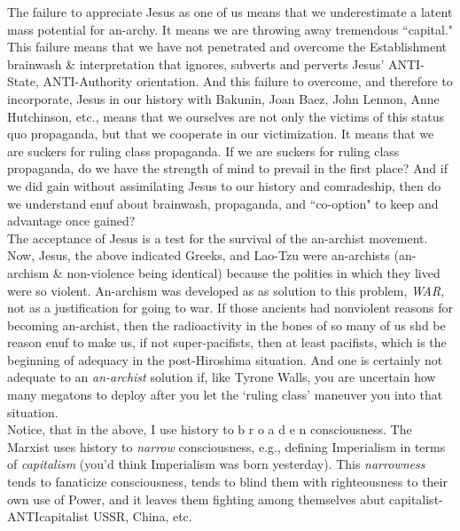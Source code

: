 \documentclass[12pt, onecolumn, letterpaper, oneside]{book}
\begin{document}
The failure to appreciate Jesus as one of us means that we underestimate a latent mass potential for an-archy. It means we are throwing away tremendous ``capital." This failure means that we have not penetrated and overcome the Establishment brainwash \& interpretation that ignores, subverts and perverts Jesus' ANTI-State, ANTI-Authority orientation. And this failure to overcome, and therefore to incorporate, Jesus in our history with Bakunin, Joan Baez, John Lennon, Anne Hutchinson, etc., means that we ourselves are not only the victims of this status quo propaganda, but that we cooperate in our victimization. It means that we are suckers for ruling class propaganda. If we are suckers for ruling class propaganda, do we have the strength of mind to prevail in the first place? And if we did gain without assimilating Jesus to our history and comradeship, then do we understand enuf about brainwash, propaganda, and ``co-option" to keep and advantage once gained?\\
The acceptance of Jesus is a test for the survival of the an-archist movement.\\
Now, Jesus, the above indicated Greeks, and Lao-Tzu were an-archists (an-archism \& non-violence being identical) because the polities in which they lived were so violent. An-archism was developed as as solution to this problem, \emph{WAR}, not as a justification for going to war. If those ancients had nonviolent reasons for becoming an-archist, then the radioactivity in the bones of so many of us shd be reason enuf to make us, if not super-pacifists, then at least pacifists, which is the beginning of adequacy in the post-Hiroshima situation. And one is certainly not adequate to an \emph{an-archist} solution if, like Tyrone Walls, you are uncertain how many megatons to deploy after you let the `ruling class' maneuver you into that situation.\\
Notice, that in the above, I use history to b r o a d e n consciousness. The Marxist uses history to \emph{narrow} consciousness, e.g., defining Imperialism in terms of \emph{capitalism} (you'd think Imperialism was born yesterday). This \emph{narrowness} tends to fanaticize consciousness, tends to blind them with righteousness to their own use of Power, and it leaves them fighting among themselves abut capitalist-ANTIcapitalist USSR, China, etc.
\end{document}
